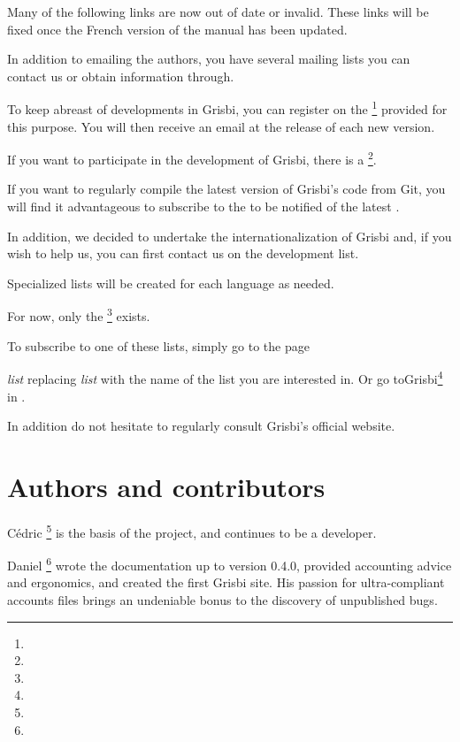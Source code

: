  Many of the following links are now out of date or invalid.  These links will be fixed once the French version of the manual has been updated.

In addition to emailing the authors, you have several mailing lists you can contact us or obtain information through.

To keep abreast of developments in Grisbi, you can register on the  \footnote{ \urlListInfoEmail{}} provided for this purpose.  You will then receive an email at the release of each new version.

If you want to participate in the development of Grisbi, there is a  \footnote{ \urlListDevelEmail{}}.

If you want to regularly compile the latest version of Grisbi's code from \gls{Git}, you will find it advantageous to subscribe to the  to be notified of the latest .

In addition, we decided to undertake the internationalization of Grisbi and, if you wish to help us, you can first contact us on the development list.

Specialized lists will be created for each language as needed.

For now, only the  \footnote{ \urlListAnglaiseEmail{}} exists.

To subscribe to one of these lists, simply go to the page

\urlListSF{} \emph{list} replacing \emph{list} with the name of the list you are interested in. Or go to{Grisbi}\footnote{ \urlGrisbi{}} in .

In addition do not hesitate to regularly consult Grisbi's official website.


\newpage

\section{Authors and contributors\label{introduction-authors}}

{Cédric } \footnote{ \urlCedricAugerEmail{}} is the basis of the project, and continues to be a developer.

{Daniel } \footnote{ \urlDanielCartronEmail{}} wrote the documentation up to version 0.4.0, provided accounting advice and ergonomics, and created the first Grisbi site. His passion for ultra-compliant accounts files brings an undeniable bonus to the discovery of unpublished bugs.

